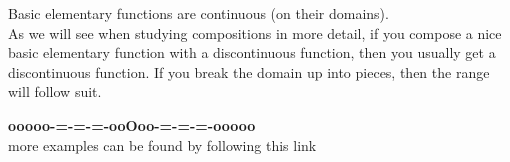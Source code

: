 \documentclass{ximera}
\begin{document}
Basic elementary functions are continuous (on their domains). \\

As we will see when studying compositions in more detail, if you compose a nice basic elementary function with a discontinuous function, then you usually get a discontinuous function.  If you break the domain up into pieces, then the range will follow suit.


























\begin{center}
\textbf{\textcolor{green!50!black}{ooooo-=-=-=-ooOoo-=-=-=-ooooo}} \\

more examples can be found by following this link\\ 

\end{center}
\end{document}
